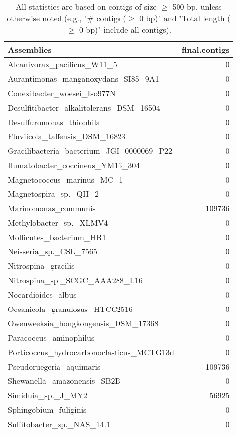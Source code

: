 \documentclass[12pt,a4paper]{article}
\begin{document}
\begin{table}[ht]
\begin{center}
\caption{All statistics are based on contigs of size $\geq$ 500 bp, unless otherwise noted (e.g., "\# contigs ($\geq$ 0 bp)" and "Total length ($\geq$ 0 bp)" include all contigs).}
\begin{tabular}{|l*{1}{|r}|}
\hline
Assemblies & final.contigs \\ \hline
Alcanivorax\_pacificus\_W11\_5 & 0 \\ \hline
Aurantimonas\_manganoxydans\_SI85\_9A1 & 0 \\ \hline
Conexibacter\_woesei\_Iso977N & 0 \\ \hline
Desulfitibacter\_alkalitolerans\_DSM\_16504 & 0 \\ \hline
Desulfuromonas\_thiophila & 0 \\ \hline
Fluviicola\_taffensis\_DSM\_16823 & 0 \\ \hline
Gracilibacteria\_bacterium\_JGI\_0000069\_P22 & 0 \\ \hline
Ilumatobacter\_coccineus\_YM16\_304 & 0 \\ \hline
Magnetococcus\_marinus\_MC\_1 & 0 \\ \hline
Magnetospira\_sp.\_QH\_2 & 0 \\ \hline
Marinomonas\_communis & 109736 \\ \hline
Methylobacter\_sp.\_XLMV4 & 0 \\ \hline
Mollicutes\_bacterium\_HR1 & 0 \\ \hline
Neisseria\_sp.\_CSL\_7565 & 0 \\ \hline
Nitrospina\_gracilis & 0 \\ \hline
Nitrospina\_sp.\_SCGC\_AAA288\_L16 & 0 \\ \hline
Nocardioides\_albus & 0 \\ \hline
Oceanicola\_granulosus\_HTCC2516 & 0 \\ \hline
Owenweeksia\_hongkongensis\_DSM\_17368 & 0 \\ \hline
Paracoccus\_aminophilus & 0 \\ \hline
Porticoccus\_hydrocarbonoclasticus\_MCTG13d & 0 \\ \hline
Pseudoruegeria\_aquimaris & 109736 \\ \hline
Shewanella\_amazonensis\_SB2B & 0 \\ \hline
Simiduia\_sp.\_J\_MY2 & 56925 \\ \hline
Sphingobium\_fuliginis & 0 \\ \hline
Sulfitobacter\_sp.\_NAS\_14.1 & 0 \\ \hline

\end{tabular}
\end{center}
\end{table}
\end{document}
